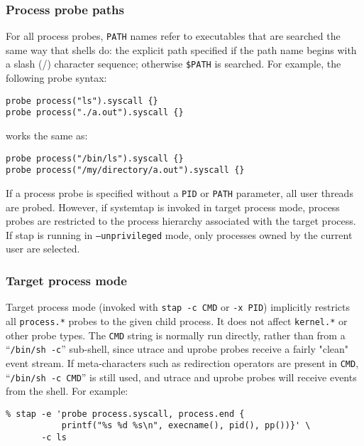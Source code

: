 \documentclass[twoside,english]{article}
\newenvironment{vindent}
{\begin{list}{}{\setlength{\listparindent}{6pt}}
\item[]}
{\end{list}}
\begin{document}
\subsubsection{Process probe paths}
\label{sec:paths}
For all process probes, \texttt{PATH} names refer to executables that
are searched the same way that shells do: the explicit path specified
if the path name begins with a slash (/) character sequence; otherwise
\texttt{\$PATH} is searched.  For example, the following probe syntax:
\begin{vindent}
\begin{verbatim}
probe process("ls").syscall {}
probe process("./a.out").syscall {}
\end{verbatim}
\end{vindent}

works the same as:
\begin{vindent}
\begin{verbatim}
probe process("/bin/ls").syscall {}
probe process("/my/directory/a.out").syscall {}
\end{verbatim}
\end{vindent}

If a process probe is specified without a \texttt{PID} or
\texttt{PATH} parameter, all user threads are probed. However, if
systemtap is invoked in target process mode, process probes are
restricted to the process hierarchy associated with the target
process. If stap is running in \texttt{--unprivileged} mode, only
processes owned by the current user are selected.

\subsubsection{Target process mode}
\label{sec:targetprocessmode}
Target process mode (invoked with \texttt{stap -c CMD} or \texttt{-x
  PID}) implicitly restricts all \texttt{process.*} probes to the
given child process.  It does not affect \texttt{kernel.*} or other
probe types.  The \texttt{CMD} string is normally run directly, rather
than from a ``\texttt{/bin/sh -c}'' sub-shell, since utrace and uprobe
probes receive a fairly "clean" event stream.  If meta-characters such
as redirection operators are present in \texttt{CMD}, ``\texttt{/bin/sh
  -c CMD}'' is still used, and utrace and uprobe probes will receive
events from the shell. For example:
\begin{vindent}
\begin{verbatim}
% stap -e 'probe process.syscall, process.end {
           printf("%s %d %s\n", execname(), pid(), pp())}' \
       -c ls
\end{verbatim}
\end{vindent}
\end{document}
